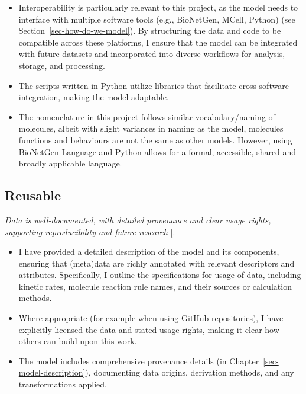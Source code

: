 \documentclass[
  11pt,
  letterpaper,
]{scrreprt}
\providecommand{\tightlist}{%
  \setlength{\itemsep}{0pt}\setlength{\parskip}{0pt}}\usepackage{longtable,booktabs,array}
\begin{document}
\begin{itemize}
\tightlist
\item
  Interoperability is particularly relevant to this project, as the
  model needs to interface with multiple software tools (e.g.,
  BioNetGen, MCell, Python) (see Section~\ref{sec-how-do-we-model}). By
  structuring the data and code to be compatible across these platforms,
  I ensure that the model can be integrated with future datasets and
  incorporated into diverse workflows for analysis, storage, and
  processing.
\item
  The scripts written in Python utilize libraries that facilitate
  cross-software integration, making the model adaptable.
\item
  The nomenclature in this project follows similar vocabulary/naming of
  molecules, albeit with slight variances in naming as the model,
  molecules functions and behaviours are not the same as other models.
  However, using BioNetGen Language and Python allows for a formal,
  accessible, shared and broadly applicable language.
\end{itemize}

\subsection{Reusable}\label{reusable}

\emph{Data is well-documented, with detailed provenance and clear usage
rights, supporting reproducibility and future research}
{[}\citeproc{ref-jacobsen2020FAIR}{377}{]}.

\begin{itemize}
\tightlist
\item
  I have provided a detailed description of the model and its
  components, ensuring that (meta)data are richly annotated with
  relevant descriptors and attributes. Specifically, I outline the
  specifications for usage of data, including kinetic rates, molecule
  reaction rule names, and their sources or calculation methods.
\item
  Where appropriate (for example when using GitHub repositories), I have
  explicitly licensed the data and stated usage rights, making it clear
  how others can build upon this work.
\item
  The model includes comprehensive provenance details (in
  Chapter~\ref{sec-model-description}), documenting data origins,
  derivation methods, and any transformations applied.
\end{itemize}
\end{document}
